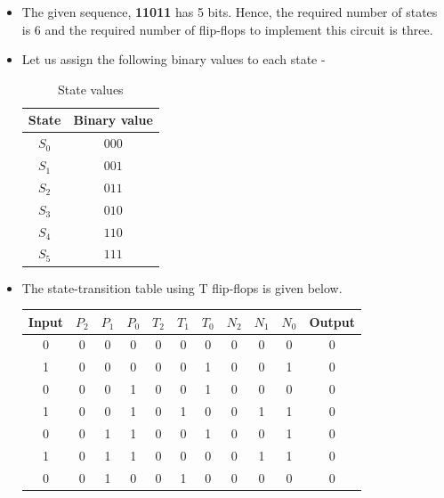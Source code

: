 \documentclass[a4paper,12pt]{article}
\begin{document}
\begin{itemize}
    \item The given sequence, \textbf{11011} has 5 bits. Hence, the required number of states is 6 and the required number of flip-flops to implement this circuit is three.
    \item Let us assign the following binary values to each state - \\
    \begin{table}[ht]
    \centering
    \begin{tabular}{|c|c|}
        \hline
        \textbf{State} & \textbf{Binary value} \\
        \hline
        $S_0$ & $000$ \\
        \hline
        $S_1$ & $001$ \\
        \hline
        $S_2$ & $011$ \\
        \hline
        $S_3$ & $010$ \\
        \hline
        $S_4$ & $110$ \\
        \hline
        $S_5$ & $111$ \\
        \hline
    \end{tabular}
    \caption{State values}
    \label{tab:state_values}
\end{table}
    \item The state-transition table using T flip-flops is given below. \\
    \begin{table}[ht]
    \centering
    \begin{tabular}{|c||c|c|c||c|c|c||c|c|c||c|}
        \hline
        \textbf{Input} & \textbf{$P_{2}$} &  \textbf{$P_1$} & \textbf{$P_0$} & \textbf{$T_2$} & \textbf{$T_1$} & \textbf{$T_0$} & \textbf{$N_2$} & \textbf{$N_1$} & \textbf{$N_0$} & \textbf{Output}\\
        \hline
        0 & 0 & 0 & 0 & 0 & 0 & 0 & 0 & 0 & 0 & 0 \\
        \hline
        1 & 0 & 0 & 0 & 0 & 0 & 1 & 0 & 0 & 1 & 0 \\
        \hline
        0 & 0 & 0 & 1 & 0 & 0 & 1 & 0 & 0 & 0 & 0 \\
        \hline
        1 & 0 & 0 & 1 & 0 & 1 & 0 & 0 & 1 & 1 & 0 \\
        \hline
        0 & 0 & 1 & 1 & 0 & 0 & 1 & 0 & 0 & 1 & 0 \\
        \hline
        1 & 0 & 1 & 1 & 0 & 0 & 0 & 0 & 1 & 1 & 0 \\
        \hline
        0 & 0 & 1 & 0 & 0 & 1 & 0 & 0 & 0 & 0 & 0 \\

\end{tabular}
\end{table}
\end{itemize}
\end{document}
